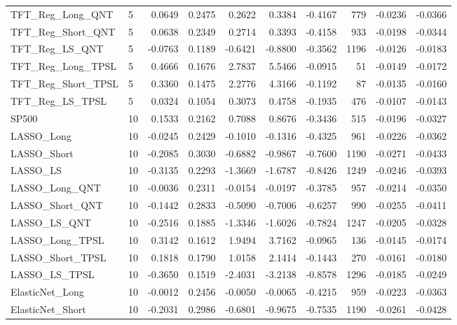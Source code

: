 \begin{tabular}{llrrrrrrrr}
\cline{1-10}
TFT\_Reg\_Long\_QNT & 5 & 0.0649 & 0.2475 & 0.2622 & 0.3384 & -0.4167 & 779 & -0.0236 & -0.0366 \\
\cline{1-10}
TFT\_Reg\_Short\_QNT & 5 & 0.0638 & 0.2349 & 0.2714 & 0.3393 & -0.4158 & 933 & -0.0198 & -0.0344 \\
\cline{1-10}
TFT\_Reg\_LS\_QNT & 5 & -0.0763 & 0.1189 & -0.6421 & -0.8800 & -0.3562 & 1196 & -0.0126 & -0.0183 \\
\cline{1-10}
TFT\_Reg\_Long\_TPSL & 5 & 0.4666 & 0.1676 & 2.7837 & 5.5466 & -0.0915 & 51 & -0.0149 & -0.0172 \\
\cline{1-10}
TFT\_Reg\_Short\_TPSL & 5 & 0.3360 & 0.1475 & 2.2776 & 4.3166 & -0.1192 & 87 & -0.0135 & -0.0160 \\
\cline{1-10}
TFT\_Reg\_LS\_TPSL & 5 & 0.0324 & 0.1054 & 0.3073 & 0.4758 & -0.1935 & 476 & -0.0107 & -0.0143 \\
\cline{1-10}
SP500 & 10 & 0.1533 & 0.2162 & 0.7088 & 0.8676 & -0.3436 & 515 & -0.0196 & -0.0327 \\
\cline{1-10}
LASSO\_Long & 10 & -0.0245 & 0.2429 & -0.1010 & -0.1316 & -0.4325 & 961 & -0.0226 & -0.0362 \\
\cline{1-10}
LASSO\_Short & 10 & -0.2085 & 0.3030 & -0.6882 & -0.9867 & -0.7600 & 1190 & -0.0271 & -0.0433 \\
\cline{1-10}
LASSO\_LS & 10 & -0.3135 & 0.2293 & -1.3669 & -1.6787 & -0.8426 & 1249 & -0.0246 & -0.0393 \\
\cline{1-10}
LASSO\_Long\_QNT & 10 & -0.0036 & 0.2311 & -0.0154 & -0.0197 & -0.3785 & 957 & -0.0214 & -0.0350 \\
\cline{1-10}
LASSO\_Short\_QNT & 10 & -0.1442 & 0.2833 & -0.5090 & -0.7006 & -0.6257 & 990 & -0.0255 & -0.0411 \\
\cline{1-10}
LASSO\_LS\_QNT & 10 & -0.2516 & 0.1885 & -1.3346 & -1.6026 & -0.7824 & 1247 & -0.0205 & -0.0328 \\
\cline{1-10}
LASSO\_Long\_TPSL & 10 & 0.3142 & 0.1612 & 1.9494 & 3.7162 & -0.0965 & 136 & -0.0145 & -0.0174 \\
\cline{1-10}
LASSO\_Short\_TPSL & 10 & 0.1818 & 0.1790 & 1.0158 & 2.1414 & -0.1443 & 270 & -0.0161 & -0.0180 \\
\cline{1-10}
LASSO\_LS\_TPSL & 10 & -0.3650 & 0.1519 & -2.4031 & -3.2138 & -0.8578 & 1296 & -0.0185 & -0.0249 \\
\cline{1-10}
ElasticNet\_Long & 10 & -0.0012 & 0.2456 & -0.0050 & -0.0065 & -0.4215 & 959 & -0.0223 & -0.0363 \\
\cline{1-10}
ElasticNet\_Short & 10 & -0.2031 & 0.2986 & -0.6801 & -0.9675 & -0.7535 & 1190 & -0.0261 & -0.0428 \\

\end{tabular}
